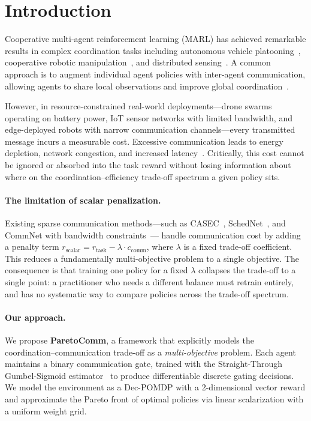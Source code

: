 \documentclass[runningheads]{llncs}
\begin{document}
\section{Introduction}
\label{sec:intro}

Cooperative multi-agent reinforcement learning (MARL) has achieved
remarkable results in complex coordination tasks including autonomous
vehicle platooning~\cite{zhou2019smarts}, cooperative robotic
manipulation~\cite{guhur2021humanoid}, and distributed
sensing~\cite{zhang2021multi}.
A common approach is to augment individual agent policies with
inter-agent communication, allowing agents to share local
observations and improve global coordination~\cite{sukhbaatar2016learning,
das2019tarmac}.

However, in resource-constrained real-world deployments---drone swarms
operating on battery power, IoT sensor networks with limited bandwidth,
and edge-deployed robots with narrow communication channels---every
transmitted message incurs a measurable cost.
Excessive communication leads to energy depletion, network congestion,
and increased latency~\cite{lin2021learning}.
Critically, this cost cannot be ignored or absorbed into the task reward
without losing information about where on the coordination--efficiency
trade-off spectrum a given policy sits.

\paragraph{The limitation of scalar penalization.}
Existing sparse communication methods---such as
CASEC~\cite{wang2020learning}, SchedNet~\cite{kim2019schednet}, and
CommNet with bandwidth constraints~\cite{sukhbaatar2016learning}---
handle communication cost by adding a penalty term
$r_\text{scalar} = r_\text{task} - \lambda \cdot c_\text{comm}$,
where $\lambda$ is a fixed trade-off coefficient.
This reduces a fundamentally multi-objective problem to a single
objective.
The consequence is that training one policy for a fixed $\lambda$
collapses the trade-off to a single point: a practitioner who needs a
different balance must retrain entirely, and has no systematic way to
compare policies across the trade-off spectrum.

\paragraph{Our approach.}
We propose \textbf{ParetoComm}, a framework that explicitly models the
coordination--communication trade-off as a \emph{multi-objective}
problem.
Each agent maintains a binary communication gate, trained with the
Straight-Through Gumbel-Sigmoid estimator~\cite{jang2017categorical}
to produce differentiable discrete gating decisions.
We model the environment as a Dec-POMDP with a 2-dimensional vector
reward and approximate the Pareto front of optimal policies via linear
scalarization with a uniform weight grid.
\end{document}
